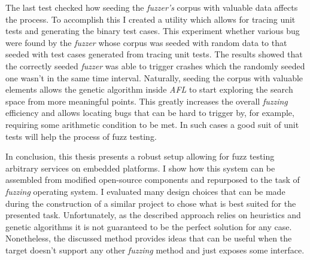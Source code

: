 The last test checked how seeding the \textit{fuzzer's} corpus with valuable data affects the process. To accomplish this I created a utility which allows for tracing unit tests and generating the binary test cases. This experiment whether various bug were found by the \textit{fuzzer} whose corpus was seeded with random data to that seeded with test cases generated from tracing unit tests. The results showed that the correctly seeded \textit{fuzzer} was able to trigger crashes which the randomly seeded one wasn't in the same time interval. Naturally, seeding the corpus with valuable elements allows the genetic algorithm inside \textit{AFL} to start exploring the search space from more meaningful points. This greatly increases the overall \textit{fuzzing} efficiency and allows locating bugs that can be hard to trigger by, for example, requiring some arithmetic condition to be met. In such cases a good suit of unit tests will help the process of fuzz testing.

In conclusion, this thesis presents a robust setup allowing for fuzz testing arbitrary services on embedded platforms. I show how this system can be assembled from modified open-source components and repurposed to the task of \textit{fuzzing} operating system. I evaluated many design choices that can be made during the construction of a similar project to chose what is best suited for the presented task. Unfortunately, as the described approach relies on heuristics and genetic algorithms it is not guaranteed to be the perfect solution for any case. Nonetheless, the discussed method provides ideas that can be useful when the target doesn't support any other \textit{fuzzing} method and just exposes some interface.